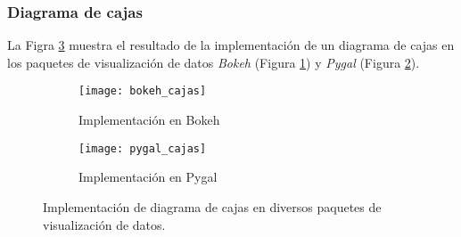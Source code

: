 \newpage

\subsubsection{Diagrama de cajas}
La Figra \ref{Fig: Cajas} muestra el resultado de la implementación de un diagrama de cajas en los paquetes de visualización de datos \emph{Bokeh} (Figura \ref{Fig: BokehCajas}) y \emph{Pygal} (Figura \ref{Fig: PygalCajas}).

\begin{figure}[!htb]
	\centering
	\begin{subfigure}[b]{0.4\textwidth}
		\centering
		\texttt{[image: bokeh\_cajas]}
		\caption{Implementación en Bokeh}
		\label{Fig: BokehCajas}
	\end{subfigure}
	\begin{subfigure}[b]{0.4\textwidth}
		\centering
		\texttt{[image: pygal\_cajas]}
		\caption{Implementación en Pygal}
		\label{Fig: PygalCajas}
	\end{subfigure}
	\caption{Implementación de diagrama de cajas en diversos paquetes de visualización de datos.}
	\label{Fig: Cajas}
\end{figure}

